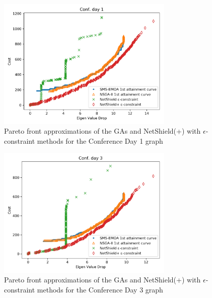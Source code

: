 \documentclass[11pt]{article}
\theoremstyle{definition}
\begin{document}
\begin{figure}[h!]
  \centering
    \includegraphics[width=0.75\textwidth]{results_ns_ga/day1_attaintment_netshield}
  \caption{Pareto front approximations of the GAs and NetShield(+) with $\epsilon$-constraint methods for the Conference Day 1 graph}
  \label{fig:day1_atns}
\end{figure}

\begin{figure}[h!]
  \centering
    \includegraphics[width=0.75\textwidth]{results_ns_ga/day3_attaintment_netshield}
  \caption{Pareto front approximations of the GAs and NetShield(+) with $\epsilon$-constraint methods for the Conference Day 3 graph}
  \label{fig:day3_atns}
\end{figure}
\end{document}
